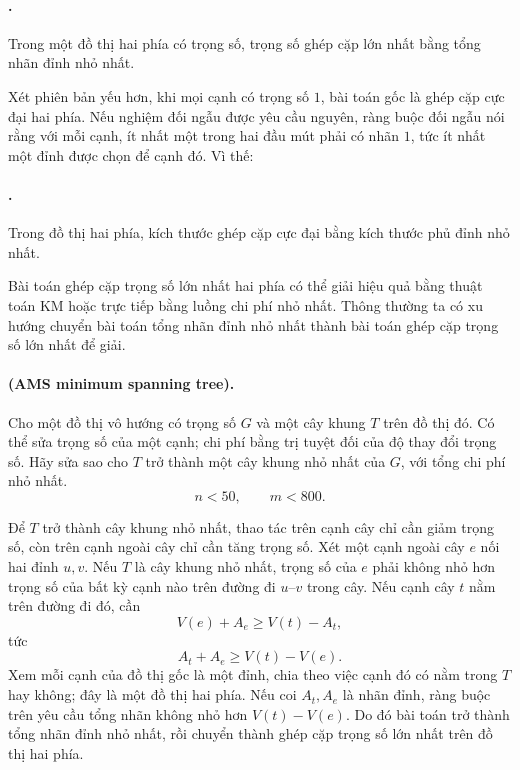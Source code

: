 \documentclass[11pt]{article}
\begin{document}
\paragraph{.}
Trong một đồ thị hai phía có trọng số, trọng số ghép cặp lớn nhất bằng tổng
nhãn đỉnh nhỏ nhất.

Xét phiên bản yếu hơn, khi mọi cạnh có trọng số \(1\), bài toán gốc là ghép
cặp cực đại hai phía. Nếu nghiệm đối ngẫu được yêu cầu nguyên, ràng buộc đối
ngẫu nói rằng với mỗi cạnh, ít nhất một trong hai đầu mút phải có nhãn \(1\),
tức ít nhất một đỉnh được chọn để  cạnh đó. Vì thế:

\paragraph{.}
Trong đồ thị hai phía, kích thước ghép cặp cực đại bằng kích thước phủ đỉnh
nhỏ nhất.

Bài toán ghép cặp trọng số lớn nhất hai phía có thể giải hiệu quả bằng thuật
toán KM hoặc trực tiếp bằng luồng chi phí nhỏ nhất. Thông thường ta có xu
hướng chuyển bài toán tổng nhãn đỉnh nhỏ nhất thành bài toán ghép cặp trọng
số lớn nhất để giải.

\paragraph{ (AMS minimum spanning tree).}
Cho một đồ thị vô hướng có trọng số \(G\) và một cây khung \(T\) trên đồ thị
đó. Có thể sửa trọng số của một cạnh; chi phí bằng trị tuyệt đối của độ thay
đổi trọng số. Hãy sửa sao cho \(T\) trở thành một cây khung nhỏ nhất của
\(G\), với tổng chi phí nhỏ nhất.
\[
  n<50,\qquad m<800.
\]

Để \(T\) trở thành cây khung nhỏ nhất, thao tác trên cạnh cây chỉ cần giảm
trọng số, còn trên cạnh ngoài cây chỉ cần tăng trọng số. Xét một cạnh ngoài
cây \(e\) nối hai đỉnh \(u,v\). Nếu \(T\) là cây khung nhỏ nhất, trọng số của
\(e\) phải không nhỏ hơn trọng số của bất kỳ cạnh nào trên đường đi \(u\)--\(v\)
trong cây. Nếu cạnh cây \(t\) nằm trên đường đi đó, cần
\[
  V(e)+A_e\ge V(t)-A_t,
\]
tức
\[
  A_t+A_e\ge V(t)-V(e).
\]
Xem mỗi cạnh của đồ thị gốc là một đỉnh, chia theo việc cạnh đó có nằm trong
\(T\) hay không; đây là một đồ thị hai phía. Nếu coi \(A_t,A_e\) là nhãn đỉnh,
ràng buộc trên yêu cầu tổng nhãn không nhỏ hơn \(V(t)-V(e)\). Do đó bài toán
trở thành tổng nhãn đỉnh nhỏ nhất, rồi chuyển thành ghép cặp trọng số lớn
nhất trên đồ thị hai phía.
\end{document}
